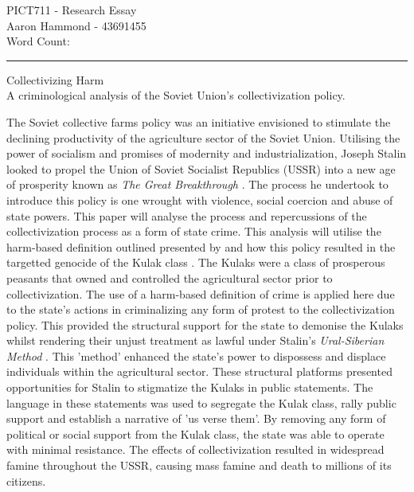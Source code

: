 \documentclass[11pt, a4paper,]{scrartcl}
\begin{document}
\vspace{-2em}
\begin{flushleft}{\footnotesize{}
PICT711 - Research Essay\\
Aaron Hammond - 43691455\\
Word Count:
}
\end{flushleft}

\hrule
\begin{center}
\huge Collectivizing Harm\\[.2cm]
\large A criminological analysis of the Soviet Union's collectivization policy. 
\end{center}
The Soviet collective farms policy was an initiative envisioned to stimulate the declining productivity of the agriculture sector of the Soviet Union. Utilising the power of socialism and promises of modernity and industrialization, Joseph Stalin looked to propel the Union of Soviet Socialist Republics (USSR) into a new age of prosperity known as \textit{The Great Breakthrough} \cite{Hughes1991}. The process he undertook to introduce this policy is one wrought with violence, social coercion and abuse of state powers. This paper will analyse the process and repercussions of the collectivization process as a form of state crime. This analysis will utilise the harm-based definition outlined presented by \cite{STEVETOMBSandDAVEWHYTE2002} and how this policy resulted in the targetted genocide of the Kulak class \cite{Meierhenrich}. The Kulaks were a class of prosperous peasants that owned and controlled the agricultural sector prior to collectivization. The use of a harm-based definition of crime is applied here due to the state's actions in criminalizing any form of protest to the collectivization policy. This provided the structural support for the state to demonise the Kulaks whilst rendering their unjust treatment as lawful under Stalin's \textit{Ural-Siberian Method} \cite{ViolaTheCountryside}. This 'method' enhanced the state's power to dispossess and displace individuals within the agricultural sector. These structural platforms presented opportunities for Stalin to stigmatize the Kulaks in public statements. The language in these statements was used to segregate the Kulak class, rally public support and establish a narrative of 'us verse them'. By removing any form of political or social support from the Kulak class, the state was able to operate with minimal resistance. The effects of collectivization resulted in widespread famine throughout the USSR, causing mass famine and death to millions of its citizens.\par
\end{document}
